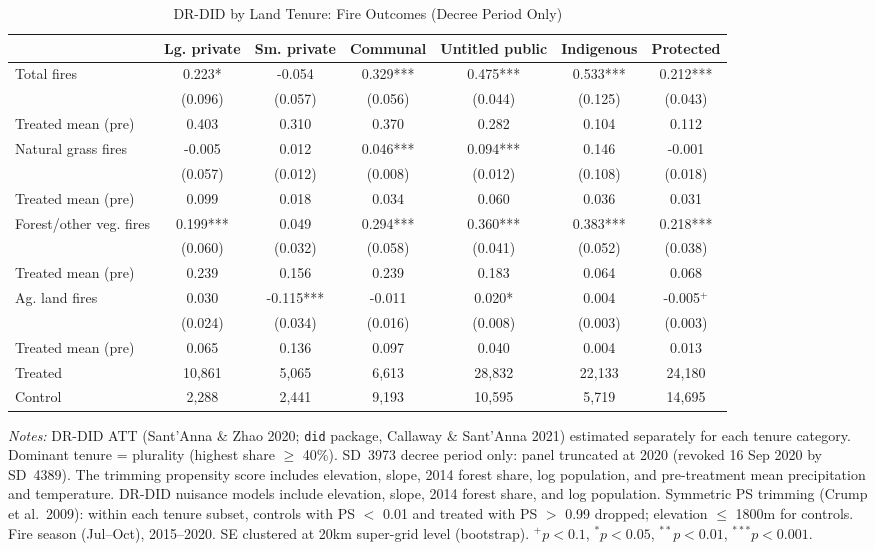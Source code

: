 \begin{table}[htbp]
\centering
\small
\caption{DR-DID by Land Tenure: Fire Outcomes (Decree Period Only)}
\label{tab:did_drdid_fire_byland_decree}
\begin{tabular}{lcccccc}
\toprule
 & Lg. private & Sm. private & Communal & Untitled public & Indigenous & Protected \\
\midrule
Total fires & 0.223* & -0.054 & 0.329*** & 0.475*** & 0.533*** & 0.212*** \\
 & (0.096) & (0.057) & (0.056) & (0.044) & (0.125) & (0.043) \\
Treated mean (pre) & 0.403 & 0.310 & 0.370 & 0.282 & 0.104 & 0.112 \\
[0.5em]
Natural grass fires & -0.005 & 0.012 & 0.046*** & 0.094*** & 0.146 & -0.001 \\
 & (0.057) & (0.012) & (0.008) & (0.012) & (0.108) & (0.018) \\
Treated mean (pre) & 0.099 & 0.018 & 0.034 & 0.060 & 0.036 & 0.031 \\
[0.5em]
Forest/other veg. fires & 0.199*** & 0.049 & 0.294*** & 0.360*** & 0.383*** & 0.218*** \\
 & (0.060) & (0.032) & (0.058) & (0.041) & (0.052) & (0.038) \\
Treated mean (pre) & 0.239 & 0.156 & 0.239 & 0.183 & 0.064 & 0.068 \\
[0.5em]
Ag. land fires & 0.030 & -0.115*** & -0.011 & 0.020* & 0.004 & -0.005$^{+}$ \\
 & (0.024) & (0.034) & (0.016) & (0.008) & (0.003) & (0.003) \\
Treated mean (pre) & 0.065 & 0.136 & 0.097 & 0.040 & 0.004 & 0.013 \\
\midrule
Treated & 10,861 & 5,065 & 6,613 & 28,832 & 22,133 & 24,180 \\
Control & 2,288 & 2,441 & 9,193 & 10,595 & 5,719 & 14,695 \\
\bottomrule
\end{tabular}
\begin{tablenotes}[flushleft]
\small
\item \textit{Notes:} DR-DID ATT (Sant'Anna \& Zhao 2020; \texttt{did} package, Callaway \& Sant'Anna 2021) estimated separately for each tenure category. Dominant tenure = plurality (highest share $\geq$ 40\%). SD~3973 decree period only: panel truncated at 2020 (revoked 16 Sep 2020 by SD~4389). The trimming propensity score includes elevation, slope, 2014 forest share, log population, and pre-treatment mean precipitation and temperature. DR-DID nuisance models include elevation, slope, 2014 forest share, and log population. Symmetric PS trimming (Crump et al.\ 2009): within each tenure subset, controls with PS $<$ 0.01 and treated with PS $>$ 0.99 dropped; elevation $\leq$ 1800m for controls. Fire season (Jul--Oct), 2015--2020. SE clustered at 20km super-grid level (bootstrap). $^{+}p<0.1$, $^{*}p<0.05$, $^{**}p<0.01$, $^{***}p<0.001$.
\end{tablenotes}
\end{table}
